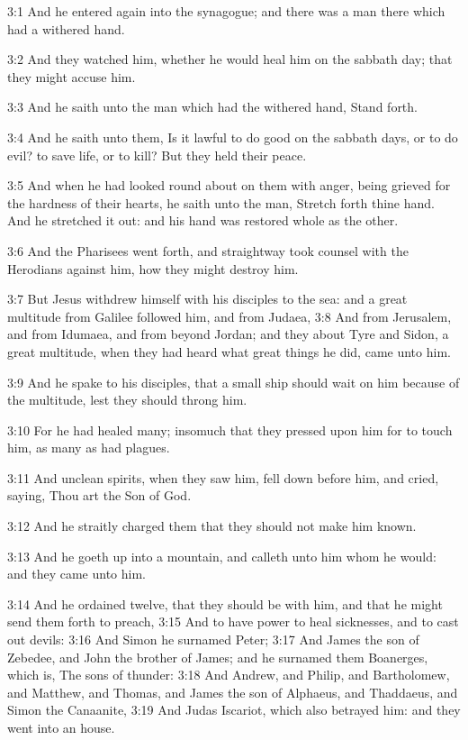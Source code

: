 3:1 And he entered again into the synagogue; and there was a man there which had a withered hand.

3:2 And they watched him, whether he would heal him on the sabbath day; that they might accuse him.

3:3 And he saith unto the man which had the withered hand, Stand forth.

3:4 And he saith unto them, Is it lawful to do good on the sabbath days, or to do evil? to save life, or to kill? But they held their peace.

3:5 And when he had looked round about on them with anger, being grieved for the hardness of their hearts, he saith unto the man, Stretch forth thine hand. And he stretched it out: and his hand was restored whole as the other.

3:6 And the Pharisees went forth, and straightway took counsel with the Herodians against him, how they might destroy him.

3:7 But Jesus withdrew himself with his disciples to the sea: and a great multitude from Galilee followed him, and from Judaea, 3:8 And from Jerusalem, and from Idumaea, and from beyond Jordan; and they about Tyre and Sidon, a great multitude, when they had heard what great things he did, came unto him.

3:9 And he spake to his disciples, that a small ship should wait on him because of the multitude, lest they should throng him.

3:10 For he had healed many; insomuch that they pressed upon him for to touch him, as many as had plagues.

3:11 And unclean spirits, when they saw him, fell down before him, and cried, saying, Thou art the Son of God.

3:12 And he straitly charged them that they should not make him known.

3:13 And he goeth up into a mountain, and calleth unto him whom he would: and they came unto him.

3:14 And he ordained twelve, that they should be with him, and that he might send them forth to preach, 3:15 And to have power to heal sicknesses, and to cast out devils: 3:16 And Simon he surnamed Peter; 3:17 And James the son of Zebedee, and John the brother of James; and he surnamed them Boanerges, which is, The sons of thunder: 3:18 And Andrew, and Philip, and Bartholomew, and Matthew, and Thomas, and James the son of Alphaeus, and Thaddaeus, and Simon the Canaanite, 3:19 And Judas Iscariot, which also betrayed him: and they went into an house.

